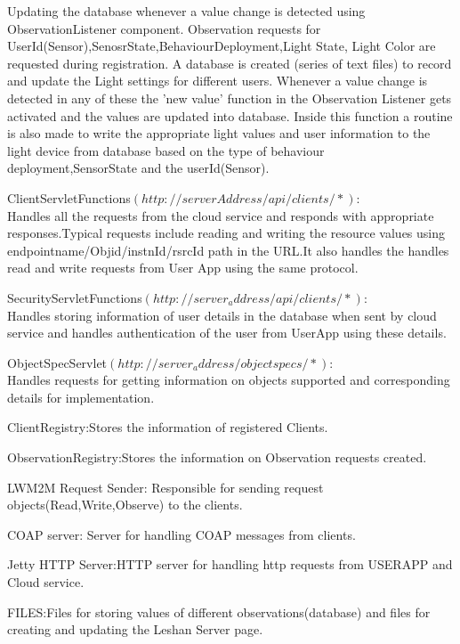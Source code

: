 Updating the database whenever a value change is detected using ObservationListener component. Observation requests for UserId(Sensor),SenosrState,BehaviourDeployment,Light State, Light Color are requested during registration. A database is created (series of text files) to record and update the Light settings for different users. Whenever a value change is detected in any of these the 'new value' function in the Observation Listener gets activated and the values are updated into database. Inside this function a routine is also made to write the appropriate light values and user information to the light device from database based on the type of behaviour deployment,SensorState and the userId(Sensor).


ClientServletFunctions$(http://serverAddress/api/clients/*)$:\\
Handles all the requests from the cloud service and responds with appropriate responses.Typical requests include reading and writing the resource values using endpointname/Objid/instnId/rsrcId path in the URL.It also handles the handles read and write requests from User App using the same protocol.


SecurityServletFunctions$(http://server_address/api/clients/*)$:\\
Handles storing information of user details in the database  when sent by cloud service and handles authentication of the user from UserApp using these details.

ObjectSpecServlet$(http://server_address/objectspecs/*)$:\\
Handles requests for getting information on objects supported and corresponding details for implementation.


ClientRegistry:Stores the information of registered Clients.

ObservationRegistry:Stores the information on Observation requests created.

LWM2M Request Sender: Responsible for sending request objects(Read,Write,Observe) to the clients.

COAP server: Server for handling COAP messages from clients.

Jetty HTTP Server:HTTP server for handling http requests from USERAPP and Cloud service.

FILES:Files for storing values of different observations(database) and files for creating and updating the Leshan Server page. 

